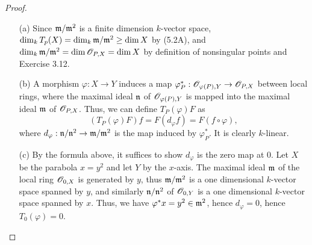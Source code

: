 \documentclass{article}
\begin{document}
\begin{enumerate} [label=\textbf{\arabic*.}, leftmargin=0cm]
\begin{proof} $ $ \vspace{0pt}
    \begin{itemize} [leftmargin=0cm]
        \item[(a)] Since $\mathfrak{m} / \mathfrak{m}^2$ is a finite dimension $k$-vector space, $\dim_k{T_p(X)} = \dim_k{\mathfrak{m} / \mathfrak{m}^2} \geq \dim{X}$ by (5.2A), and $\dim_k{\mathfrak{m} / \mathfrak{m}^2} = \dim{\mathscr{O}_{P, X}} = \dim{X}$ by definition of nonsingular points and Exercise 3.12.

        \item[(b)] A morphism $\varphi : X \to Y$ induces a map $\varphi_{P}^* : \mathscr{O}_{\varphi(P), Y} \to \mathscr{O}_{P, X}$ between local rings, where the maximal ideal $\mathfrak{n}$ of $\mathscr{O}_{\varphi(P), Y}$ is mapped into the maximal ideal $\mathfrak{m}$ of $\mathscr{O}_{P, X}$. Thus, we can define $T_P(\varphi)F$ as
        \begin{equation*}
            (T_P(\varphi)F)f = F(d_\varphi f) = F(f \circ \varphi),
        \end{equation*}
        where $d_\varphi : \mathfrak{n} / \mathfrak{n}^2 \to \mathfrak{m} / \mathfrak{m}^2$ is the map induced by $\varphi_P^*$. It is clearly $k$-linear.

        \item[(c)] By the formula above, it suffices to show $d_\varphi$ is the zero map at $0$. Let $X$ be the parabola $x = y^2$ and let $Y$ by the $x$-axis. The maximal ideal $\mathfrak{m}$ of the local ring $\mathscr{O}_{0, X}$ is generated by $y$, thus $\mathfrak{m} / \mathfrak{m}^2$ is a one dimensional $k$-vector space spanned by $y$, and similarly $\mathfrak{n} / \mathfrak{n}^2$ of $\mathscr{O}_{0, Y}$ is a one dimensional $k$-vector space spanned by $x$. Thus, we have $\varphi^* x = y^2 \in \mathfrak{m}^2$, hence $d_\varphi = 0$, hence $T_0(\varphi) = 0$.
    \end{itemize} 
\end{proof}

\end{enumerate}
\end{document}
